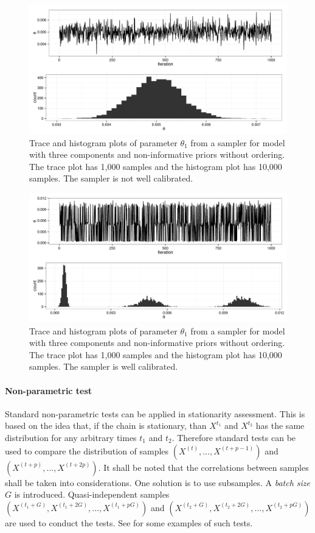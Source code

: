 \begin{figure}
  \includegraphics[width=\linewidth]{fig/PET_MH_Diag}
  \caption{Trace and histogram plots of parameter $\theta_1$ from a \mcmc
    sampler for \pet model with three components and non-informative priors
    without ordering. The trace plot has 1,000 samples and the histogram plot
    has 10,000 samples. The sampler is not well calibrated.}
  \label{fig:pet diag}
\end{figure}

\begin{figure}
  \includegraphics[width=\linewidth]{fig/PET_MH_Diag_C}
  \caption{Trace and histogram plots of parameter $\theta_1$ from a \mcmc
    sampler for \pet model with three components and non-informative priors
    without ordering. The trace plot has 1,000 samples and the histogram plot
    has 10,000 samples. The sampler is well calibrated.}
  \label{fig:pet diag c}
\end{figure}

\paragraph{Non-parametric test}

Standard non-parametric tests can be applied in stationarity assessment. This
is based on the idea that, if the chain is stationary, than $X^{t_1}$ and
$X^{t_2}$ has the same distribution for any arbitrary times $t_1$ and $t_2$.
Therefore standard tests can be used to compare the distribution of samples
$(X^{(t)},\dots,X^{(t+p-1)})$ and $(X^{(t+p)},\dots,X^{(t+2p)})$. It shall be
noted that the correlations between samples shall be taken into
considerations. One solution is to use subsamples. A \emph{batch size} $G$ is
introduced. Quasi-independent samples
$(X^{(t_1+G)},X^{(t_1+2G)},\dots,X^{(t_1+pG)})$ and
$(X^{(t_2+G)},X^{(t_2+2G)},\dots,X^{(t_2+pG)})$ are used to conduct the tests.
See \cite[][sec.~12.2.2]{Robert:2004tn} for some examples of such tests.

